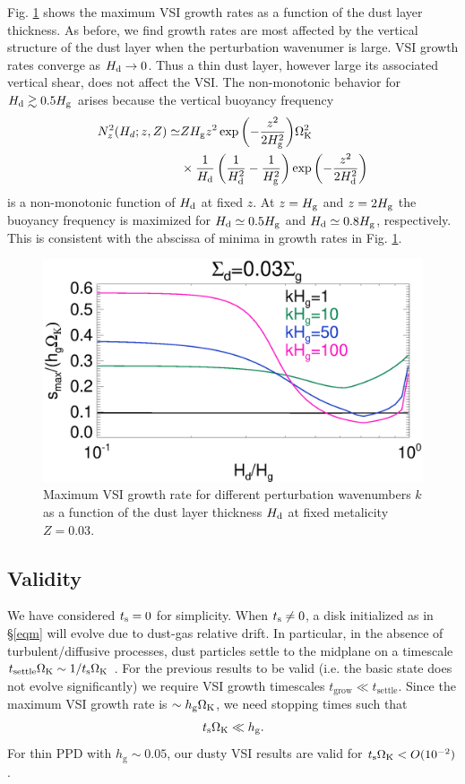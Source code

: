 Fig. \ref{compare_eigenvals_fixZ} shows the maximum VSI growth rates
as a function of the dust layer thickness. As before, we find growth
rates are most affected by the vertical structure of the dust layer
when the perturbation wavenumer is large. VSI growth rates converge as
$H_\mathrm{d}\to 0$. %
Thus a thin dust layer, however large its associated vertical shear,
does not affect the VSI. The non-monotonic behavior for $H_\mathrm{d}\gtrsim
0.5H_\mathrm{g}$ arises because the vertical buoyancy frequency 
\begin{align*}
N_z^2(H_d;z,Z) \simeq &ZH_\mathrm{g} z^2
\exp{\left(-\frac{z^2}{2H_\mathrm{g}^2}\right)}\Omega_{\rm K}^2\notag\\
&\times 
\frac{1}{H_\mathrm{d}}\left(\frac{1}{H_\mathrm{d}^2} -
\frac{1}{H_\mathrm{g}^2}\right)\exp{\left(-\frac{z^2}{2H_\mathrm{d}^2}\right)}  
\end{align*}
is a non-monotonic function of $H_\mathrm{d}$ at fixed $z$. At $z=H_\mathrm{g}$ and $z=2H_\mathrm{g}$
the buoyancy frequency is maximized for $H_\mathrm{d}\simeq0.5H_\mathrm{g}$ and
$H_\mathrm{d}\simeq 0.8H_\mathrm{g}$, respectively. This is consistent with the abscissa
of minima in growth rates in Fig. \ref{compare_eigenvals_fixZ}. 

\begin{figure}
  \includegraphics[width=\linewidth]{figures/compare_eigenvals_fixZ} 
  \caption{Maximum VSI growth rate for different perturbation
    wavenumbers $k$ as a function of the dust layer
    thickness $H_\mathrm{d}$ at fixed metalicity $Z=0.03$. 
    \label{compare_eigenvals_fixZ}
    }
\end{figure}

\subsection{Validity}
We have considered $t_\mathrm{s}=0$ for simplicity. When $t_\mathrm{s}\neq0$, a 
disk initialized as in \S\ref{eqm} will evolve 
due to dust-gas relative drift. In particular, in the
absence of turbulent/diffusive processes, dust particles settle to the
midplane on a timescale $t_\mathrm{settle}\Omega_{\rm K} \sim 1/t_\mathrm{s}\Omega_{\rm K}$
\citep{takeuchi02}. For the previous results to be valid (i.e. the
basic state does not evolve significantly) we require VSI growth
timescales $t_\mathrm{grow}\ll t_\mathrm{settle}$. Since the maximum
VSI growth rate is $\sim h_\mathrm{g}\Omega_{\rm K}$, we need stopping times
such that 
\begin{align}
  t_\mathrm{s}\Omega_{\rm K} \ll h_\mathrm{g}. 
\end{align} 
For thin PPD with $h_\mathrm{g}\sim 0.05$, our dusty VSI results are
valid for $t_\mathrm{s}\Omega_{\rm K} < O(10^{-2})$.  
